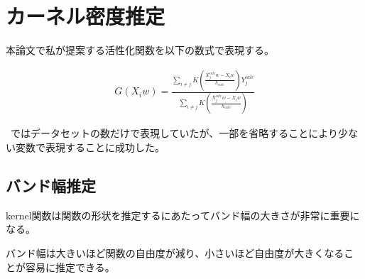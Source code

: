 \section{カーネル密度推定}



本論文で私が提案する活性化関数を以下の数式で表現する。


\begin{eqnarray}
G(X_iw)=\frac{\sum_{i\neq j} K\left(\frac{X^{calc}_j w - X_i w}{h_{calc}}\right)Y^{calc}_j}{\sum_{i\neq j} K\left(\frac{X^{calc}_j w - X_i w}{h_{calc}}\right)}
\label{eq:k-af}
\end{eqnarray}

~\cite{ichimura}ではデータセットの数だけで表現していたが、一部を省略することにより少ない変数で表現することに成功した。



\subsection{バンド幅推定}
kernel関数は関数の形状を推定するにあたってバンド幅の大きさが非常に重要になる。

バンド幅は大きいほど関数の自由度が減り、小さいほど自由度が大きくなることが容易に推定できる。



